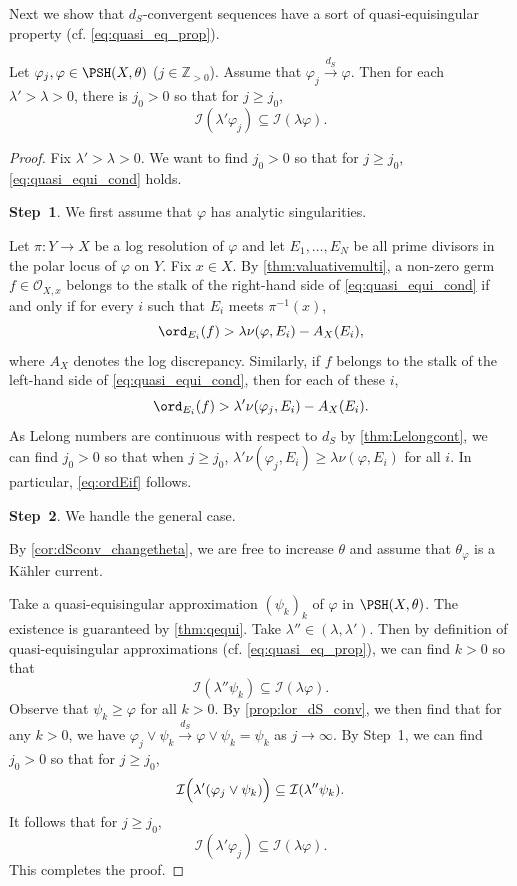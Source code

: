 Next we show that $d_S$-convergent sequences have a sort of quasi-equisingular property (cf. \eqref{eq:quasi_eq_prop}).
\begin{theorem}\label{thm:equising_cond_general}
    Let $\varphi_j,\varphi\in \PSH(X,\theta)$ ($j\in \mathbb{Z}_{>0}$). Assume that $\varphi_j\xrightarrow{d_S}\varphi$. Then for each $\lambda'>\lambda>0$, there is $j_0>0$ so that for $j\geq j_0$,
    \begin{equation}\label{eq:quasi_equi_cond}
        \mathcal{I}(\lambda' \varphi_j)\subseteq \mathcal{I}(\lambda \varphi).
    \end{equation}
\end{theorem}
\begin{proof}
Fix $\lambda'>\lambda>0$. We want to find $j_0>0$ so that for $j\geq j_0$, \eqref{eq:quasi_equi_cond} holds.

\textbf{Step~1}. We first assume that $\varphi$ has analytic singularities.

Let $\pi\colon Y\rightarrow X$ be a log resolution of $\varphi$ and let $E_1,\ldots,E_N$ be all prime divisors in the polar locus of $\varphi$ on $Y$.
Fix $x\in X$. By \cref{thm:valuativemulti}, a non-zero germ $f\in\mathcal O_{X,x}$ belongs to the stalk of the right-hand side of \eqref{eq:quasi_equi_cond} if and only if for every $i$ such that $E_i$ meets $\pi^{-1}(x)$,
\begin{equation}\label{eq:ordEif}
\ord_{E_i}(f)>\lambda \nu(\varphi,E_i)-A_X(E_i),
\end{equation}
where $A_X$ denotes the log discrepancy.
Similarly, if $f$ belongs to the stalk of the left-hand side of \eqref{eq:quasi_equi_cond}, then for each of these $i$,
\[
\ord_{E_i}(f)> \lambda'\nu(\varphi_j,E_i)-A_X(E_i).
\]
As Lelong numbers are continuous with respect to $d_S$ by \cref{thm:Lelongcont}, we can find $j_0>0$ so that when $j\geq j_0$, $\lambda'\nu(\varphi_j,E_i)\geq \lambda \nu(\varphi,E_i)$ for all $i$. In particular, \eqref{eq:ordEif} follows.

\textbf{Step~2}. We handle the general case.

By \cref{cor:dSconv_changetheta}, we are free to increase $\theta$ and assume that $\theta_{\varphi}$ is a Kähler current.

Take a quasi-equisingular approximation $(\psi_k)_k$ of $\varphi$ in $\PSH(X,\theta)$. The existence is guaranteed by \cref{thm:qequi}.
Take $\lambda''\in (\lambda,\lambda')$. Then by definition of quasi-equisingular approximations (cf. \eqref{eq:quasi_eq_prop}), we can find $k>0$ so that
\[
    \mathcal{I}(\lambda''\psi_k)\subseteq \mathcal{I}(\lambda \varphi).
\]
Observe that $\psi_k\geq \varphi$ for all $k>0$. By \cref{prop:lor_dS_conv}, we then find that for any $k>0$, we have $\varphi_j\lor \psi_k\xrightarrow{d_S}\varphi\lor \psi_k=\psi_k$ as $j\to\infty$.
By Step~1, we can find $j_0>0$ so that for $j\geq j_0$,
\[
    \mathcal{I}\Bigl(\lambda' (\varphi_j\lor \psi_k)\Bigr)\subseteq \mathcal{I}(\lambda''\psi_k).
\]
It follows that for $j\geq j_0$,
\[
    \mathcal{I}(\lambda' \varphi_j)\subseteq  \mathcal{I}(\lambda \varphi).
\]
This completes the proof.
\end{proof}
